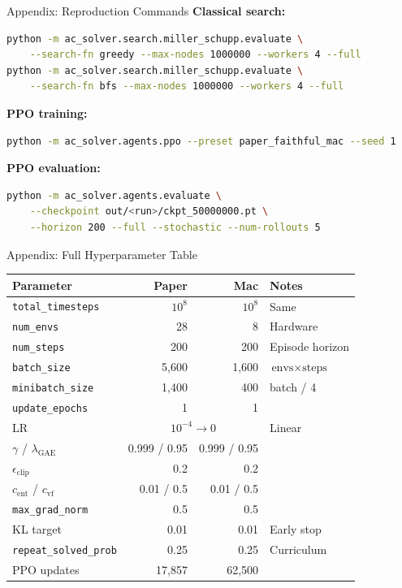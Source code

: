 \documentclass[aspectratio=169,11pt]{beamer}
\begin{document}
\begin{frame}[fragile]{Appendix: Reproduction Commands}
  \small
  \textbf{Classical search:}
  \begin{lstlisting}[language=bash]
python -m ac_solver.search.miller_schupp.evaluate \
    --search-fn greedy --max-nodes 1000000 --workers 4 --full
python -m ac_solver.search.miller_schupp.evaluate \
    --search-fn bfs --max-nodes 1000000 --workers 4 --full
  \end{lstlisting}

  \textbf{PPO training:}
  \begin{lstlisting}[language=bash]
python -m ac_solver.agents.ppo --preset paper_faithful_mac --seed 1
  \end{lstlisting}

  \textbf{PPO evaluation:}
  \begin{lstlisting}[language=bash]
python -m ac_solver.agents.evaluate \
    --checkpoint out/<run>/ckpt_50000000.pt \
    --horizon 200 --full --stochastic --num-rollouts 5
  \end{lstlisting}
\end{frame}

\begin{frame}{Appendix: Full Hyperparameter Table}
  \scriptsize
  \begin{center}
  \begin{tabular}{lrrl}
    \toprule
    \textbf{Parameter} & \textbf{Paper} & \textbf{Mac} & \textbf{Notes} \\
    \midrule
    \texttt{total\_timesteps}    & $10^8$  & $10^8$  & Same \\
    \texttt{num\_envs}           & 28      & 8       & Hardware \\
    \texttt{num\_steps}          & 200     & 200     & Episode horizon \\
    \texttt{batch\_size}         & 5{,}600 & 1{,}600 & $\text{envs} \times \text{steps}$ \\
    \texttt{minibatch\_size}     & 1{,}400 & 400     & batch / 4 \\
    \texttt{update\_epochs}      & 1       & 1       & \\
    LR                           & \multicolumn{2}{c}{$10^{-4} \to 0$} & Linear \\
    $\gamma$ / $\lambda_\text{GAE}$ & 0.999 / 0.95 & 0.999 / 0.95 & \\
    $\epsilon_\text{clip}$       & 0.2     & 0.2     & \\
    $c_\text{ent}$ / $c_\text{vf}$ & 0.01 / 0.5 & 0.01 / 0.5 & \\
    \texttt{max\_grad\_norm}     & 0.5     & 0.5     & \\
    KL target                    & 0.01    & 0.01    & Early stop \\
    \texttt{repeat\_solved\_prob}& 0.25    & 0.25    & Curriculum \\
    \midrule
    PPO updates                  & 17{,}857 & 62{,}500 & \\
    \bottomrule
  \end{tabular}
  \end{center}
\end{frame}
\end{document}
